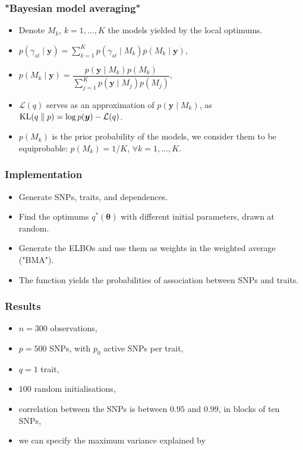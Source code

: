 \documentclass{beamer}
\DeclareMathOperator*{\KL}{{\rm KL}}
\begin{document}
\begin{frame}
\frametitle{"Bayesian model averaging"}
\begin{itemize}
\item Denote $M_k$, $k= 1,\ldots, K$ the models yielded by the local optimums.
\item $p(\gamma_{st} \mid \boldsymbol{y}) = \sum_{k=1}^{K}p(\gamma_{st}\mid M_k)p(M_k \mid \boldsymbol{y})$,
\item $p(M_k \mid \boldsymbol{y}) = \dfrac{p(\boldsymbol{y} \mid M_k)p(M_k)}{\sum_{j=1}^{K}p(\boldsymbol{y}\mid M_j)p(M_j)},$
\item $\mathcal{L}(q)$ serves as an approximation of $p(\boldsymbol{y} \mid M_k)$, as $\KL(q\parallel p) = \log p(\boldsymbol{y}) - \mathcal{L}(q)$.
\item $p(M_k)$ is the prior probability of the models, we consider them to be equiprobable: $p(M_k) = 1/K$, $\forall k = 1,\ldots,K$.
\end{itemize}
\end{frame}

\begin{frame}
\frametitle{Implementation}
\begin{itemize}
\item Generate SNPs, traits, and dependences.
\item Find the optimums $q^*(\boldsymbol{\theta})$ with different initial parameters, drawn at random.
\item Generate the ELBOs and use them as weights in the weighted average ("BMA").
\item The function yields the probabilities of association between SNPs and traits.
\end{itemize}
\end{frame}




\begin{frame}
\frametitle{Results}
\begin{itemize}
\item $n = 300$ observations,
\item $p = 500$ SNPs, with $p_0$ active SNPs per trait,
\item $q = 1$ trait,
\item $100$ random initialisations,
\item correlation between the SNPs is between $0.95$ and $0.99$, in blocks of ten SNPs,
\item we can specify the maximum variance explained by 
\end{itemize}
\end{frame}
\end{document}
